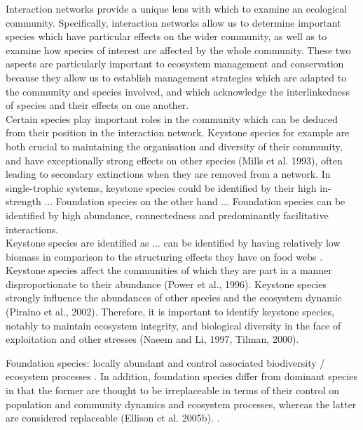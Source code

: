 \documentclass[a4,12pt]{article}
\begin{document}
        Interaction networks provide a unique lens with which to examine an ecological community. Specifically, interaction networks allow us to determine important species which have particular effects on the wider community, as well as to examine how species of interest are affected by the whole community. These two aspects are particularly important to ecosystem management and conservation because they allow us to establish management strategies which are adapted to the community and species involved, and which acknowledge the interlinkedness of species and their effects on one another.  \\

        Certain species play important roles in the community which can be deduced from their position in the interaction network. Keystone species for example are both crucial to maintaining the organisation and diversity of their community, and have exceptionally strong effects on other species (Mills et al. 1993), often leading to secondary extinctions when they are removed from a network. In single-trophic systems, keystone species could be identified by their high in-strength ... Foundation species on the other hand ... Foundation species can be identified by high abundance, connectedness and predominantly facilitative interactions. \\

        Keystone species are identified as ... can be identified by having relatively low biomass in comparison to the structuring effects they have on food webs \citep{Libralato2006}. 
    Keystone species affect the communities of which they are part in a manner disproportionate to their abundance (Power et al., 1996). Keystone species strongly influence the abundances of other species and the ecosystem dynamic (Piraino et al., 2002). Therefore, it is important to identify keystone species, notably to maintain ecosystem integrity, and biological diversity in the face of exploitation and other stresses (Naeem and Li, 1997, Tilman, 2000).

    Foundation species: locally abundant and control associated biodiversity / ecosystem processes \citep{Baiser2013}. In addition, foundation species differ from dominant species in that the former are thought to be irreplaceable in terms of their control on population and community dynamics and ecosystem processes, whereas the latter are considered replaceable (Ellison et al. 2005b). \citep{Ellison2005}.
\end{document}
